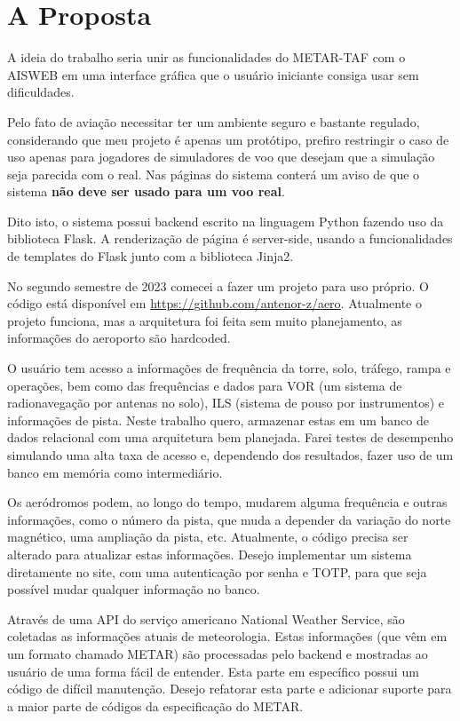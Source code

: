 \chapter{A Proposta}
A ideia do trabalho seria unir as funcionalidades do METAR-TAF com o AISWEB
em uma interface gráfica que o usuário iniciante consiga usar sem dificuldades.

Pelo fato de aviação necessitar ter um ambiente seguro e bastante regulado, considerando
que meu projeto é apenas um protótipo, prefiro restringir o caso de uso apenas
para jogadores de simuladores de voo que desejam que a simulação seja parecida
com o real. Nas páginas do sistema conterá um aviso de que o sistema \textbf{não
deve ser usado para um voo real}.

Dito isto, o sistema possui backend escrito na linguagem Python fazendo uso
da biblioteca Flask. A renderização de página é server-side, usando a funcionalidades
de templates do Flask junto com a biblioteca Jinja2.

No segundo semestre de 2023 comecei a fazer um projeto para uso próprio.
O código está disponível em \url{https://github.com/antenor-z/aero}. Atualmente o
projeto funciona, mas a arquitetura foi feita sem muito planejamento, as
informações do aeroporto são hardcoded.

O usuário tem acesso a informações de frequência da torre, solo, tráfego, rampa
e operações, bem como das frequências e dados para VOR (um sistema de radionavegação
por antenas no solo), ILS (sistema de pouso por instrumentos) e informações
de pista. Neste trabalho quero, armazenar estas
em um banco de dados relacional com uma arquitetura bem planejada. Farei testes
de desempenho simulando uma alta taxa de acesso e, dependendo dos resultados,
fazer uso de um banco em memória como intermediário. 

Os aeródromos podem, ao longo do tempo, mudarem alguma frequência e outras
informações, como o número da pista, que muda a depender da variação do norte magnético,
uma ampliação da pista, etc.
Atualmente, o código precisa ser alterado para atualizar estas informações.
Desejo implementar um sistema diretamente no site, com uma autenticação por
senha e TOTP, para que seja possível mudar qualquer informação no banco.

Através de uma API do serviço americano National Weather Service, são coletadas 
as informações atuais de meteorologia. Estas informações (que vêm em um formato
chamado METAR) são processadas pelo backend e mostradas ao usuário de uma forma 
fácil de entender. Esta parte em específico possui um código de difícil manutenção.
Desejo refatorar esta parte e adicionar suporte para a maior parte de códigos
da especificação do METAR.
